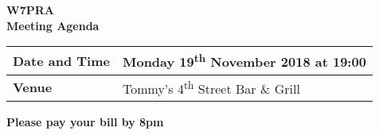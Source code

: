 \documentclass[letter,11pt]{extarticle}
\begin{document}
	\thispagestyle{empty}
	
	\begin{center}
		\textbf{W7PRA\\Meeting Agenda}
		\vspace{0.33cm}
	\end{center}
	
	\begin{center}
		\begin{tabular}{| m{3.0cm} | m{7.5cm} |} \hline
			\textbf{Date and Time} & Monday 19\textsuperscript{th} November 2018 at 19:00 \\ \hline
			\textbf{Venue} & Tommy's 4\textsuperscript{th} Street Bar \& Grill \\ \hline
				\end{tabular}
	\end{center}
	
	\begin{center}
		\textbf{Please pay your bill by 8pm}
	\end{center}
	
\end{document}
